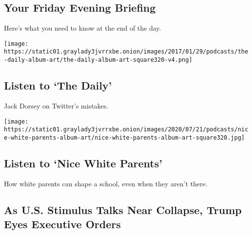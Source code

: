 \href{/2020/08/07/briefing/jobs-school-reopenings-summer-desserts.html}{}

\hypertarget{your-friday-evening-briefing}{%
\subsection{Your Friday Evening
Briefing}\label{your-friday-evening-briefing}}

Here's what you need to know at the end of the day.

\href{/2020/08/07/podcasts/the-daily/Jack-dorsey-twitter-trump.html}{}

\texttt{[image: https://static01.graylady3jvrrxbe.onion/images/2017/01/29/podcasts/the-daily-album-art/the-daily-album-art-square320-v4.png]}

\href{/2020/08/07/podcasts/the-daily/Jack-dorsey-twitter-trump.html}{}

\hypertarget{listen-to-the-daily}{%
\subsection{Listen to `The Daily'}\label{listen-to-the-daily}}

Jack Dorsey on Twitter's mistakes.

\href{/2020/08/06/podcasts/episode-three-this-is-our-school-how-dare-you.html}{}

\texttt{[image: https://static01.graylady3jvrrxbe.onion/images/2020/07/21/podcasts/nice-white-parents-album-art/nice-white-parents-album-art-square320.jpg]}

\href{/2020/08/06/podcasts/episode-three-this-is-our-school-how-dare-you.html}{}

\hypertarget{listen-to-nice-white-parents}{%
\subsection{Listen to `Nice White
Parents'}\label{listen-to-nice-white-parents}}

How white parents can shape a school, even when they aren't there.

\href{/2020/08/07/world/covid-19-news.html}{}

\hypertarget{as-us-stimulus-talks-near-collapse-trump-eyes-executive-orders}{%
\subsection{As U.S. Stimulus Talks Near Collapse, Trump Eyes Executive
Orders}\label{as-us-stimulus-talks-near-collapse-trump-eyes-executive-orders}}

